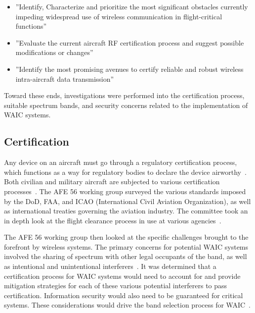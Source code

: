 \begin{itemize}
\item ''Identify, Characterize and prioritize the most significant obstacles currently impeding widespread use of wireless communication in flight-critical functions''

\item ''Evaluate the current aircraft RF certification process and suggest possible modifications or changes''

\item ''Identify the most promising avenues to certify reliable and robust wireless intra-aircraft data transmission''
\end{itemize}

Toward these ends, investigations were performed into the certification process, suitable spectrum bands, and security concerns related to the implementation of WAIC systems. 

\subsection{Certification}
Any device on an aircraft must go through a regulatory certification process, which functions as a way for regulatory bodies to declare the device airworthy~\cite{ferrell_feasibility_2007}. Both civilian and military aircraft are subjected to various certification processes~\cite{ferrell_feasibility_2007}. The AFE 56 working group surveyed the various standards imposed by the DoD, FAA, and ICAO (International Civil Aviation Organization), as well as international treaties governing the aviation industry. The committee took an in depth look at the flight clearance process in use at various agencies~\cite{ferrell_feasibility_2007}. 

The AFE 56 working group then looked at the specific challenges brought to the forefront by wireless systems. The primary concerns for potential WAIC  systems involved the sharing of spectrum with other legal occupants of the band,  as well as intentional and unintentional interferers~\cite{ferrell_feasibility_2007}. It was determined that a certification process for WAIC systems would need to account for and provide mitigation strategies for each of these various potential interferers to pass certification. Information security would also need to be guaranteed for critical systems. These considerations would drive the band selection process for WAIC~\cite{ferrell_feasibility_2007}. 

